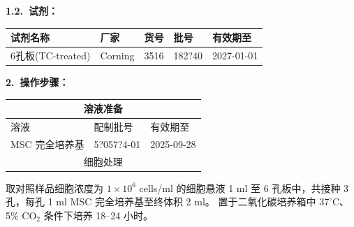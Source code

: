 \documentclass[UTF8,10pt,a4paper,fontset=fandol]{ctexart}
\newcommand{\fieldvalue}[1]{#1}
\newcommand{\handwritten}[1]{#1}
\begin{document}
\textbf{1.2.\ 试剂：}

\begin{tabularx}{\textwidth}{|X|X|X|X|X|}
\hline
试剂名称 & 厂家 & 货号 & 批号 & 有效期至 \\ \hline
6孔板(TC-treated) &
\fieldvalue{Corning} &
\fieldvalue{3516} &
\fieldvalue{\handwritten{182?40}} &
\fieldvalue{\handwritten{2027-01-01}} \\ \hline
\end{tabularx}

\textbf{2.\ 操作步骤：}

\begin{tabularx}{\textwidth}{|X|X|X|}
\hline
\multicolumn{3}{|c|}{溶液准备} \\ \hline
溶液 & 配制批号 & 有效期至 \\ \hline
MSC 完全培养基 &
\fieldvalue{\handwritten{5?057?4-01}} &
\fieldvalue{\handwritten{2025-09-28}} \\ \hline
\multicolumn{3}{|c|}{细胞处理} \\ \hline
\end{tabularx}

取对照样品细胞浓度为 $1\times10^{6}$ cells/ml 的细胞悬液
1 ml 至 6 孔板中，共接种 3 孔，每孔 1 ml MSC 完全培养基至终体积 2 ml。
置于二氧化碳培养箱中 $37^\circ$C、5\% CO$_2$ 条件下培养 18--24 小时。
\end{document}
